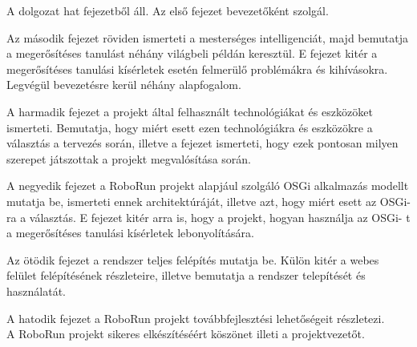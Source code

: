 	A dolgozat hat fejezetből áll. Az első fejezet bevezetőként szolgál.
	
	 Az második fejezet röviden ismerteti a mesterséges intelligenciát, majd bemutatja a megerősítéses tanulást néhány világbeli példán keresztül. E fejezet kitér a megerősítéses tanulási kísérletek esetén felmerülő problémákra és kihívásokra. Legvégül bevezetésre kerül néhány alapfogalom.

	A harmadik fejezet a projekt által felhasznált technológiákat és eszközöket ismerteti. Bemutatja, hogy miért esett ezen technológiákra és eszközökre a választás a tervezés során, illetve a fejezet ismerteti, hogy ezek pontosan milyen szerepet játszottak a projekt megvalósítása során.	 
	
	A negyedik fejezet a RoboRun projekt alapjául szolgáló OSGi alkalmazás modellt mutatja be, ismerteti ennek architektúráját, illetve azt, hogy  miért esett az OSGi-ra a választás. E fejezet kitér arra is, hogy a projekt, hogyan használja az OSGi- t a megerősítéses tanulási kísérletek lebonyolítására.
	
	Az ötödik fejezet a rendszer teljes felépítés mutatja be. Külön kitér a webes felület felépítésének részleteire, illetve bemutatja a rendszer telepítését és használatát.
	
	A hatodik fejezet a RoboRun projekt továbbfejlesztési lehetőségeit részletezi.
\\A RoboRun projekt sikeres elkészítéséért köszönet illeti a projektvezetőt.
